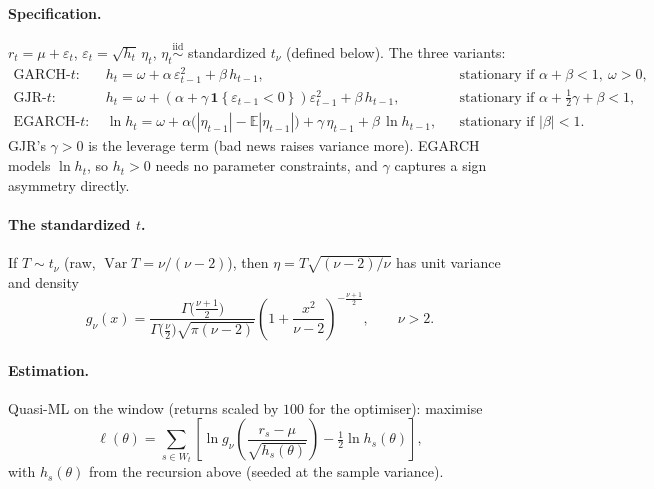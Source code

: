 \documentclass[11pt,a4paper]{article}
\newcommand{\E}{\mathbb{E}}
\newcommand{\Var}{\operatorname{Var}}
\newcommand{\Ind}[1]{\mathbf{1}\!\left\{#1\right\}}
\begin{document}
\paragraph{Specification.} $r_t = \mu + \varepsilon_t$,
$\varepsilon_t = \sqrt{h_t}\,\eta_t$, $\eta_t\stackrel{\text{iid}}{\sim}$
standardized $t_\nu$ (defined below). The three variants:
\begin{align}
  \text{GARCH-}t:\ & h_t = \omega + \alpha\,\varepsilon_{t-1}^2 + \beta\,h_{t-1},
                     &&\text{stationary if } \alpha+\beta<1,\ \omega>0, \\
  \text{GJR-}t:\ & h_t = \omega + (\alpha + \gamma\,\Ind{\varepsilon_{t-1}<0})\varepsilon_{t-1}^2 + \beta\,h_{t-1},
                     &&\text{stationary if } \alpha + \tfrac12\gamma + \beta<1, \\
  \text{EGARCH-}t:\ & \ln h_t = \omega + \alpha\big(|\eta_{t-1}|-\E|\eta_{t-1}|\big) + \gamma\,\eta_{t-1} + \beta\,\ln h_{t-1},
                     &&\text{stationary if } |\beta|<1 .
\end{align}
GJR's $\gamma>0$ is the leverage term (bad news raises variance more). EGARCH
models $\ln h_t$, so $h_t>0$ needs no parameter constraints, and $\gamma$
captures a sign asymmetry directly.

\paragraph{The standardized $t$.} If $T\sim t_\nu$ (raw, $\Var T = \nu/(\nu-2)$),
then $\eta = T\sqrt{(\nu-2)/\nu}$ has unit variance and density
\begin{equation}
  g_\nu(x) = \frac{\Gamma\!\big(\tfrac{\nu+1}{2}\big)}
                  {\Gamma\!\big(\tfrac{\nu}{2}\big)\sqrt{\pi(\nu-2)}}
             \left(1 + \frac{x^2}{\nu-2}\right)^{-\frac{\nu+1}{2}},
             \qquad \nu > 2 .
\end{equation}

\paragraph{Estimation.} Quasi-ML on the window (returns scaled by $100$ for the
optimiser): maximise
\begin{equation}
  \ell(\theta) = \sum_{s\in W_t}\left[
     \ln g_\nu\!\left(\frac{r_s - \mu}{\sqrt{h_s(\theta)}}\right)
     - \tfrac12\ln h_s(\theta)\right],
\end{equation}
with $h_s(\theta)$ from the recursion above (seeded at the sample variance).
\end{document}
